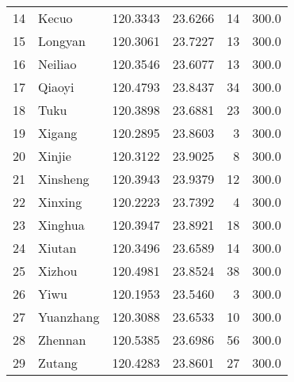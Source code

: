\begin{table}[h!]
\begin{tabular}{llrrrr}
		14 & Kecuo             & 120.3343           & 23.6266           & 14                     & 300.0                     \\
		15 & Longyan           & 120.3061           & 23.7227           & 13                     & 300.0                     \\
		16 & Neiliao           & 120.3546           & 23.6077           & 13                     & 300.0                     \\
		17 & Qiaoyi            & 120.4793           & 23.8437           & 34                     & 300.0                     \\
		18 & Tuku              & 120.3898           & 23.6881           & 23                     & 300.0                     \\
		19 & Xigang            & 120.2895           & 23.8603           & 3                      & 300.0                     \\
		20 & Xinjie            & 120.3122           & 23.9025           & 8                      & 300.0                     \\
		21 & Xinsheng          & 120.3943           & 23.9379           & 12                     & 300.0                     \\
		22 & Xinxing           & 120.2223           & 23.7392           & 4                      & 300.0                     \\
		23 & Xinghua           & 120.3947           & 23.8921           & 18                     & 300.0                     \\
		24 & Xiutan            & 120.3496           & 23.6589           & 14                     & 300.0                     \\
		25 & Xizhou            & 120.4981           & 23.8524           & 38                     & 300.0                     \\
		26 & Yiwu              & 120.1953           & 23.5460           & 3                      & 300.0                     \\
		27 & Yuanzhang         & 120.3088           & 23.6533           & 10                     & 300.0                     \\
		28 & Zhennan           & 120.5385           & 23.6986           & 56                     & 300.0                     \\
		29 & Zutang            & 120.4283           & 23.8601           & 27                     & 300.0                     \\
		\hline
	\end{tabular}
\end{table}

